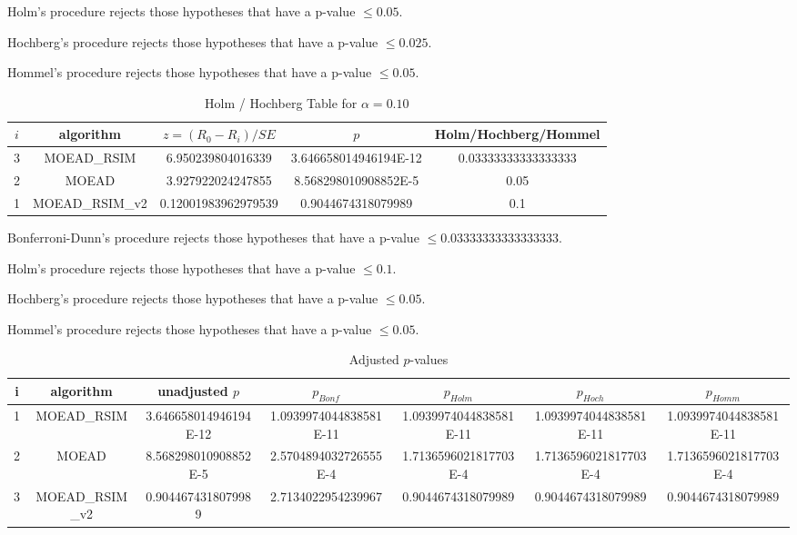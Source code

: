 \documentclass[a4paper,10pt]{article}
\begin{document}
\begin{landscape}
Holm's procedure rejects those hypotheses that have a p-value $\le0.05$.


Hochberg's procedure rejects those hypotheses that have a p-value $\le0.025$.


Hommel's procedure rejects those hypotheses that have a p-value $\le0.05$.


\begin{table}[!htp]
\centering\tiny
\caption{Holm / Hochberg Table for $\alpha=0.10$}
\begin{tabular}{ccccc}
$i$&algorithm&$z=(R_0 - R_i)/SE$&$p$&Holm/Hochberg/Hommel\\
\hline
3&MOEAD_RSIM&6.950239804016339&3.646658014946194E-12&0.03333333333333333\\
2&MOEAD&3.927922024247855&8.568298010908852E-5&0.05\\
1&MOEAD_RSIM_v2&0.12001983962979539&0.9044674318079989&0.1\\
\hline
\end{tabular}
\end{table}
Bonferroni-Dunn's procedure rejects those hypotheses that have a p-value $\le0.03333333333333333$.


Holm's procedure rejects those hypotheses that have a p-value $\le0.1$.


Hochberg's procedure rejects those hypotheses that have a p-value $\le0.05$.


Hommel's procedure rejects those hypotheses that have a p-value $\le0.05$.


\begin{table}[!htp]
\centering\tiny
\caption{Adjusted $p$-values}
\begin{tabular}{ccccccc}
i&algorithm&unadjusted $p$&$p_{Bonf}$&$p_{Holm}$&$p_{Hoch}$&$p_{Homm}$\\
\hline
1&MOEAD_RSIM&3.646658014946194E-12&1.0939974044838581E-11&1.0939974044838581E-11&1.0939974044838581E-11&1.0939974044838581E-11\\
2&MOEAD&8.568298010908852E-5&2.5704894032726555E-4&1.7136596021817703E-4&1.7136596021817703E-4&1.7136596021817703E-4\\
3&MOEAD_RSIM_v2&0.9044674318079989&2.7134022954239967&0.9044674318079989&0.9044674318079989&0.9044674318079989\\
\hline
\end{tabular}
\end{table}


\end{landscape}
\end{document}
